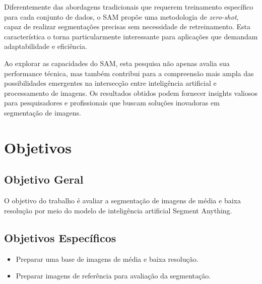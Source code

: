 Diferentemente das abordagens tradicionais que requerem treinamento específico para cada conjunto de dados, o SAM propõe uma metodologia de \textit{zero-shot}, capaz de realizar segmentações precisas sem necessidade de retreinamento. Esta característica o torna particularmente interessante para aplicações que demandam adaptabilidade e eficiência.

Ao explorar as capacidades do SAM, esta pesquisa não apenas avalia sua performance técnica, mas também contribui para a compreensão mais ampla das possibilidades emergentes na intersecção entre inteligência artificial e processamento de imagens. Os resultados obtidos podem fornecer insights valiosos para pesquisadores e profissionais que buscam soluções inovadoras em segmentação de imagens.

\section{Objetivos}

\subsection{Objetivo Geral}
O objetivo do trabalho é avaliar a segmentação de imagens de média e baixa resolução por meio do modelo de inteligência artificial Segment Anything.

\subsection{Objetivos Específicos}
\begin{itemize}
	\item Preparar uma base de imagens de média e baixa resolução.
	\item Preparar imagens de referência para avaliação da segmentação.
\end{itemize}